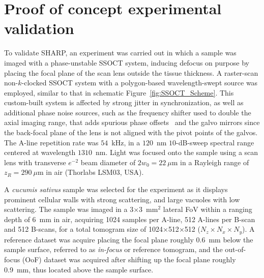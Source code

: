 \section{Proof of concept experimental validation}\label{sec:Test}

To validate SHARP, an experiment was carried out in which a sample was imaged with a phase-unstable SSOCT system, inducing defocus on purpose by placing the focal plane of the scan lens outside the tissue thickness. A raster-scan non-$k$-clocked SSOCT system with a polygon-based wavelength-swept source was employed, similar to that in schematic Figure~\ref{fig:SSOCT_Scheme}. This custom-built system is affected by strong jitter in synchronization, as well as additional phase noise sources, such as the frequency shifter used to double the axial imaging range, that adds spurious phase offsets~\cite{Yun2004_Removing} and the galvo mirrors since the back-focal plane of the lens is not aligned with the pivot points of the galvos. The A-line repetition rate was $54$~kHz, in a $120$~nm $10$-dB-sweep spectral range centered at wavelength $1310$~nm. Light was focused onto the sample using a scan lens with transverse $e^{-2}$ beam diameter of $2w_0=22~\mu$m in a Rayleigh range of $z_R=290~\mu$m in air (Thorlabs LSM03, USA).

A \textit{cucumis sativus} sample was selected for the experiment as it displays prominent cellular walls with strong scattering, and large vacuoles with low scattering. The sample was imaged in a 3$\times$3~mm$^2$ lateral FoV within a ranging depth of 6~mm in air, acquiring 1024 samples per A-line, 512 A-lines per B-scan and 512 B-scans, for a total tomogram size of 1024$\times$512$\times$512 ($N_z\times N_x\times N_y$). A reference dataset was acquire placing the focal plane roughly 0.6~mm below the sample surface, referred to as \textit{in-focus} or reference tomogram, and the out-of-focus (OoF) dataset was acquired after shifting up the focal plane roughly 0.9~mm, thus located above the sample surface.

